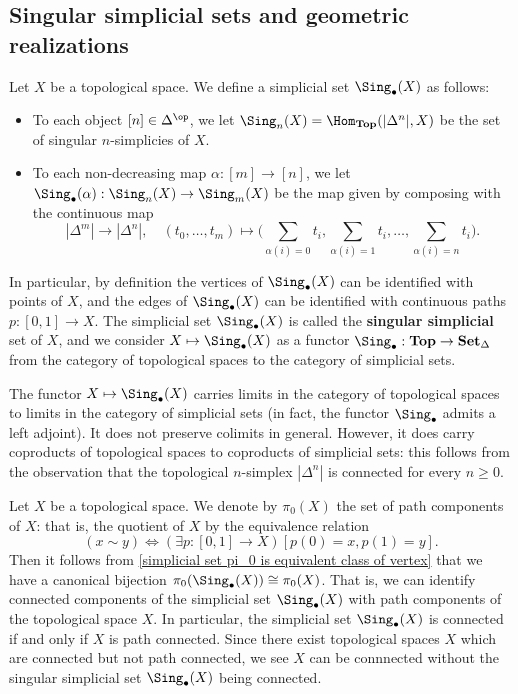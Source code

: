 \subsection{Singular simplicial sets and geometric realizations}
Let $X$ be a topological space. We define a simplicial set $\Sing_\bullet(X)$ as follows:
\begin{itemize}
\item To each object $[n]\in\Delta^{\op}$, we let $\Sing_n(X)=\Hom_{\mathbf{Top}}(|\Delta^n|,X)$ be the set of singular $n$-simplicies of $X$.
\item To each non-decreasing map $\alpha:[m]\to[n]$, we let $\Sing_\bullet(\alpha):\Sing_n(X)\to\Sing_m(X)$ be the map given by composing with the continuous map
\[|\Delta^m|\to|\Delta^n|,\quad (t_0,\dots,t_m)\mapsto\Big(\sum_{\alpha(i)=0}t_i,\sum_{\alpha(i)=1}t_i,\dots,\sum_{\alpha(i)=n}t_i\Big).\]
\end{itemize}
In particular, by definition the vertices of $\Sing_\bullet(X)$ can be identified with points of $X$, and the edges of $\Sing_\bullet(X)$ can be identified with continuous paths $p:[0,1]\to X$. The simplicial set $\Sing_\bullet(X)$ is called the \textbf{singular simplicial} set of $X$, and we consider $X\mapsto\Sing_\bullet(X)$ as a functor $\Sing_\bullet:\mathbf{Top}\to\mathbf{Set}_\Delta$ from the category of topological spaces to the category of simplicial sets.
\begin{remark}
The functor $X\mapsto\Sing_\bullet(X)$ carries limits in the category of topological spaces to limits in the category of simplicial sets (in fact, the functor $\Sing_\bullet$ admits a left adjoint). It does not preserve colimits in general. However, it does carry coproducts of topological spaces to coproducts of simplicial sets: this follows from the observation that the topological $n$-simplex $|\Delta^n|$ is connected for every $n\geq 0$.
\end{remark}
Let $X$ be a topological space. We denote by $\pi_0(X)$ the set of path components of $X$: that is, the quotient of $X$ by the equivalence relation
\[(x\sim y)\Leftrightarrow(\exists p:[0,1]\to X)[p(0)=x,p(1)=y].\]
Then it follows from \cref{simplicial set pi_0 is equivalent class of vertex} that we have a canonical bijection $\pi_0(\Sing_\bullet(X))\cong\pi_0(X)$. That is, we can identify connected components of the simplicial set $\Sing_\bullet(X)$ with path components of the topological space $X$. In particular, the simplicial set $\Sing_\bullet(X)$ is connected if and only if $X$ is path connected. Since there exist topological spaces $X$ which are connected but not path connected, we see $X$ can be connnected without the singular simplicial set $\Sing_\bullet(X)$ being connected.\par
